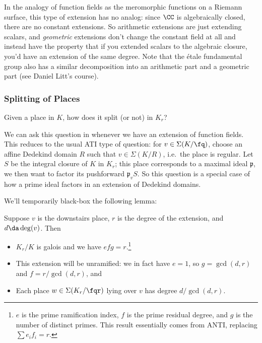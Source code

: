 In the analogy of function fields as the meromorphic functions on a
Riemann surface, this type of extension has no analog: since \(\CC\) is
algebraically closed, there are no constant extensions. So arithmetic
extensions are just extending scalars, and \emph{geometric} extensions
don't change the constant field at all and instead have the property
that if you extended scalars to the algebraic closure, you'd have an
extension of the same degree. Note that the étale fundamental group also
has a similar decomposition into an arithmetic part and a geometric part
(see Daniel Litt's course).

\hypertarget{splitting-of-places}{%
\subsubsection{Splitting of Places}\label{splitting-of-places}}

\begin{question}

Given a place in \(K\), how does it split (or not) in \(K_r\)?

\end{question}

\begin{remark}

We can ask this question in whenever we have an extension of function
fields. This reduces to the usual ATI type of question: for
\(v\in \Sigma(K/\fq)\), choose an affine Dedekind domain \(R\) such that
\(v\in \Sigma(K/R)\), i.e.~the place is regular. Let \(S\) be the
integral closure of \(K\) in \(K_r\); this place corresponds to a
maximal ideal \(\mathfrak{p}\), we then want to factor its pushforward
\(\mathfrak{p}_v S\). So this question is a special case of how a prime
ideal factors in an extension of Dedekind domains.

\end{remark}

We'll temporarily black-box the following lemma:

\begin{lemma}[?]

Suppose \(v\) is the downstairs place, \(r\) is the degree of the
extension, and \(d\da \deg(v)\). Then

\begin{itemize}
\item
  \(K_r/K\) is galois and we have \(efg = r\).\footnote{\(e\) is the
    prime ramification index, \(f\) is the prime residual degree, and
    \(g\) is the number of distinct primes. This result essentially
    comes from ANTI, replacing \(\sum e_i f_i = r\).}
\item
  This extension will be unramified: we in fact have \(e=1\), so
  \(g = \gcd(d, r)\) and \(f = r/\gcd(d, r)\), and
\item
  Each place \(w\in \Sigma(K_r/\fqr)\) lying over \(v\) has degree
  \(d/\gcd(d, r)\).
\end{itemize}

\end{lemma}

